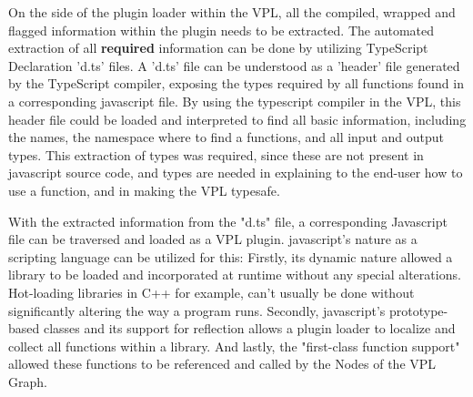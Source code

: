


On the side of the plugin loader within the VPL, all the compiled, wrapped and flagged information within the plugin needs to be extracted. 
The automated extraction of all \textbf{required} information can be done by utilizing TypeScript Declaration 'd.ts' files. 
A 'd.ts' file can be understood as a 'header' file generated by the TypeScript compiler, exposing the types required by all functions found in a corresponding javascript file.
By using the typescript compiler in the VPL, this header file could be loaded and interpreted to find all basic information, including the names, the namespace where to find a functions, and all input and output types.
This extraction of types was required, since these are not present in javascript source code, and types are needed in explaining to the end-user how to use a function, and in making the VPL typesafe.

With the extracted information from the "d.ts" file, a corresponding Javascript file can be traversed and loaded as a VPL plugin. 
javascript's nature as a scripting language can be utilized for this:
Firstly, its dynamic nature allowed a library to be loaded and incorporated at runtime without any special alterations. 
Hot-loading libraries in C++ for example, can't usually be done without significantly altering the way a program runs. 
Secondly, javascript's prototype-based classes and its support for reflection allows a plugin loader to localize and collect all functions within a library.
And lastly, the "first-class function support" allowed these functions to be referenced and called by the Nodes of the VPL Graph. 

